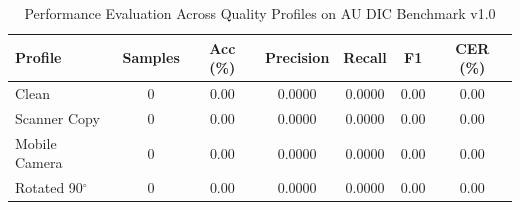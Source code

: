 \begin{table}[htbp]
\caption{Performance Evaluation Across Quality Profiles on AU DIC Benchmark v1.0}
\label{tab:profile_degradation}
\centering
\begin{tabular}{lcccccc}
\hline
\textbf{Profile} & \textbf{Samples} & \textbf{Acc (\%)} & \textbf{Precision} & \textbf{Recall} & \textbf{F1} & \textbf{CER (\%)} \\
\hline
Clean & 0 & 0.00 & 0.0000 & 0.0000 & 0.00 & 0.00 \\
Scanner Copy & 0 & 0.00 & 0.0000 & 0.0000 & 0.00 & 0.00 \\
Mobile Camera & 0 & 0.00 & 0.0000 & 0.0000 & 0.00 & 0.00 \\
Rotated 90$^\circ$ & 0 & 0.00 & 0.0000 & 0.0000 & 0.00 & 0.00 \\
\hline
\end{tabular}
\end{table}